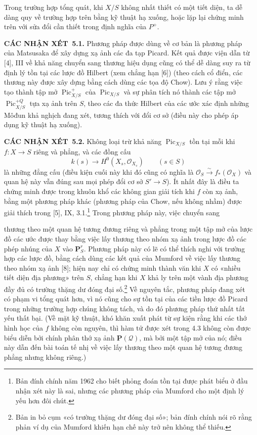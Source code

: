 \documentclass[11pt,twoside,openany]{book}
\numberwithin{equation}{section}
\newcommand{\src}[1]{%
  \phantomsection\hypertarget{src:\fgasourceid:#1}{}%
  \marginpar{\raggedleft\footnotesize\sffamily #1}%
}
\newcommand{\fgasourceid}{unset}
\newcommand{\result}[2]{\par\medskip\noindent\textbf{#1\if\relax\detokenize{#2}\relax\else\ #2\fi.}\quad}
\begin{document}
Trong trường hợp tổng quát, khi $X/S$ không nhất thiết có một tiết diện, ta dễ
dàng quy về trường hợp trên bằng kỹ thuật hạ xuống, hoặc lặp lại chứng minh
trên với sửa đổi cần thiết trong định nghĩa của $P^+$.

\result{CÁC NHẬN XÉT}{5.1} Phương pháp được dùng về cơ bản là phương pháp của
Matsusaka để xây dựng xạ ảnh các đa tạp Picard. Kết quả được viện dẫn từ [4],
III về khả năng chuyển sang thương hiệu dụng cũng có thể dễ dàng suy ra từ
định lý tồn tại các lược đồ Hilbert (xem chẳng hạn [6]) (theo cách cổ điển, các
thương này được xây dựng bằng cách dùng các tọa độ Chow). Lưu ý rằng việc tạo
thành tập mở $\operatorname{Pic}^{+}_{X/S}$ của
$\operatorname{Pic}_{X/S}$ và sự phân tích nó thành các tập mở
$\operatorname{Pic}^{+Q}_{X/S}$ tựa xạ ảnh trên $S$, theo các đa thức Hilbert
của các ước xác định những Môđun khả nghịch đang xét, tương thích với đổi cơ
sở (điều này cho phép áp dụng kỹ thuật hạ xuống).

\result{CÁC NHẬN XÉT}{5.2} Không loại trừ khả năng
$\operatorname{Pic}_{X/S}$ tồn tại mỗi khi $f:X\longrightarrow S$ riêng và
phẳng, và các đồng cấu
\[
k(s)\longrightarrow H^0(X_s,\mathcal O_{X_s})\qquad(s\in S)
\]
là những đẳng cấu (điều kiện cuối này khi đó cũng có nghĩa là
$\mathcal O_S\xrightarrow{\sim}f_*(\mathcal O_X)$ và quan hệ này vẫn đúng sau
mọi phép đổi cơ sở $S'\longrightarrow S$). Ít nhất đây là điều ta chứng minh
được trong khuôn khổ các không gian giải tích khi $f$ còn xạ ảnh, bằng một
phương pháp khác (phương pháp của Chow, nếu không nhầm) được giải thích trong
[5], IX, 3.1.\footnote{Bản đính chính năm 1962 cho biết phỏng đoán tồn tại
được phát biểu ở đầu nhận xét này là sai, nhưng các phương pháp của Mumford cho
một định lý yếu hơn đôi chút.} Trong phương pháp này, việc chuyển sang
\src{156}
thương theo một quan hệ tương đương riêng và phẳng trong một tập mở của lược
đồ các ước được thay bằng việc lấy thương theo nhóm xạ ảnh trong lược đồ các
phép nhúng của $X$ vào $\mathbf P^r_S$. Phương pháp này có lẽ có thể thích nghi
với trường hợp các lược đồ, bằng cách dùng các kết quả của Mumford về việc lấy
thương theo nhóm xạ ảnh [8]; hiện nay chỉ có chứng minh thành văn khi $X$ có
«nhiều tiết diện địa phương» trên $S$, chẳng hạn khi $X$ khả ly trên một vành
địa phương đầy đủ có trường thặng dư đóng đại số.\footnote{Bản in bỏ cụm «có
trường thặng dư đóng đại số»; bản đính chính nói rõ rằng phản ví dụ của Mumford
khiến hạn chế này trở nên không thể thiếu.} Về nguyên tắc, phương pháp đang xét
có phạm vi tổng quát hơn, vì nó cũng cho sự tồn tại của các tiền lược đồ Picard
trong những trường hợp chúng không tách, và do đó phương pháp thứ nhất tất yếu
thất bại. (Về mặt kỹ thuật, khó khăn xuất phát từ sự kiện rằng khi các thớ hình
học của $f$ không còn nguyên, thì hàm tử được xét trong 4.3 không còn được biểu
diễn bởi chính phân thớ xạ ảnh $\mathbf P(\mathcal Q)$, mà bởi một tập mở của
nó; điều này dẫn đến bài toán tế nhị về việc lấy thương theo một quan hệ tương
đương phẳng nhưng không riêng.)
\end{document}
